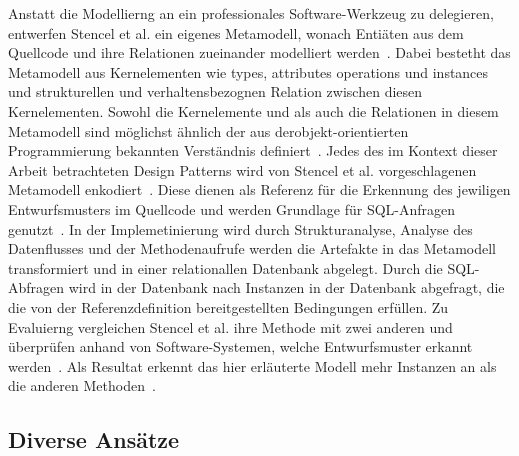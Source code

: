 Anstatt die Modellierng an ein professionales Software-Werkzeug zu delegieren, entwerfen Stencel et al. ein eigenes Metamodell, wonach Entiäten aus dem Quellcode und ihre Relationen zueinander modelliert werden~\cite[S. 27]{stencel-2008}.
Dabei bestetht das Metamodell aus Kernelementen wie types, attributes operations und instances und strukturellen und verhaltensbezognen Relation zwischen diesen Kernelementen. Sowohl die Kernelemente und als auch die Relationen in diesem Metamodell sind möglichst ähnlich der aus derobjekt-orientierten Programmierung bekannten Verständnis definiert~\cite[S. 27]{stencel-2008}.
Jedes des im Kontext dieser Arbeit betrachteten Design Patterns wird von Stencel et al. vorgeschlagenen Metamodell enkodiert~\cite[S.28 - 29]{stencel-2008}. Diese dienen als Referenz für die Erkennung des jewiligen Entwurfsmusters im Quellcode und werden Grundlage für SQL-Anfragen genutzt~\cite[S. 29]{stencel-2008}.
In der Implemetinierung wird durch Strukturanalyse, Analyse des Datenflusses und der Methodenaufrufe werden die Artefakte in das Metamodell transformiert und in einer relationallen Datenbank abgelegt.
Durch die SQL-Abfragen wird in der Datenbank nach Instanzen in der Datenbank abgefragt, die die von der Referenzdefinition bereitgestellten Bedingungen erfüllen.
Zu Evaluierng vergleichen Stencel et al. ihre Methode mit zwei anderen und überprüfen anhand von Software-Systemen, welche Entwurfsmuster erkannt werden~\cite[S. 30]{stencel-2008}.
Als Resultat erkennt das hier erläuterte Modell mehr Instanzen an als die anderen Methoden~\cite[S. 29]{stencel-2008}.

\subsection{Diverse Ansätze}



